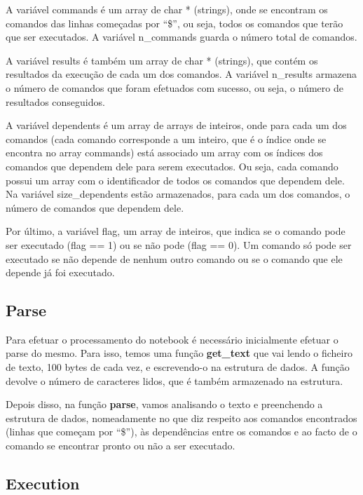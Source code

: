 \documentclass[a4paper]{article}
\begin{document}
A variável \textsf{commands} é um array de char * (strings), onde se encontram
os comandos das linhas começadas por ``\$'', ou seja, todos os comandos que terão
que ser executados. A variável \textsf{n\_commands} guarda o número total de comandos.

A variável \textsf{results} é também um array de char * (strings), que contém os
resultados da execução de cada um dos comandos. A variável \textsf{n\_results}
armazena o número de comandos que foram efetuados com sucesso, ou seja,
o número de resultados conseguidos.

A variável \textsf{dependents} é um array de arrays de inteiros,
onde para cada um dos comandos (cada comando corresponde a um inteiro,
que é o índice onde se encontra no array \textsf{commands}) está associado
um array com os índices dos comandos que dependem dele para serem executados.
Ou seja, cada comando possui um array com o identificador de todos os comandos
que dependem dele. Na variável \textsf{size\_dependents} estão armazenados,
para cada um dos comandos, o número de comandos que dependem dele.

Por último, a variável \textsf{flag}, um array de inteiros, que indica se
o comando pode ser executado (flag == 1) ou se não pode (flag == 0). Um comando
só pode ser executado se não depende de nenhum outro comando ou se o comando
que ele depende já foi executado.



\subsection{Parse}
\label{sec:parse}

Para efetuar o processamento do notebook é necessário inicialmente efetuar
o parse do mesmo. Para isso, temos uma função \textbf{get\_text} que vai lendo
o ficheiro de texto, 100 bytes de cada vez, e escrevendo-o na estrutura
de dados. A função devolve o número de caracteres lidos, que é também armazenado
na estrutura.

Depois disso, na função \textbf{parse}, vamos analisando o texto e preenchendo
a estrutura de dados, nomeadamente no que diz respeito aos comandos encontrados
(linhas que começam por ``\$''), às dependências entre os comandos e ao facto
de o comando se encontrar pronto ou não a ser executado.



\subsection{Execution}
\label{sec:execution}
\end{document}
